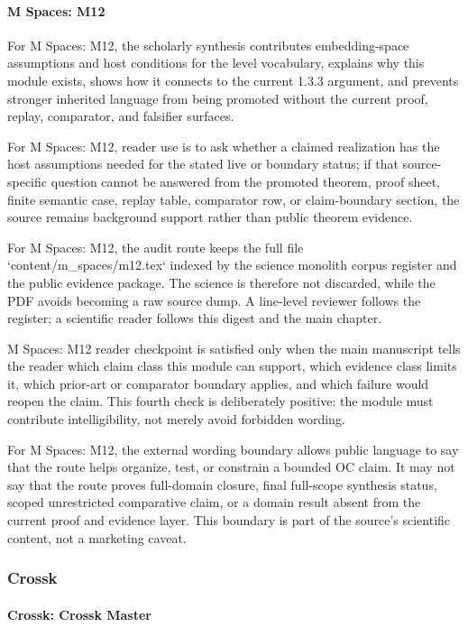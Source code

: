 \paragraph{M Spaces: M12}

For M Spaces: M12, the scholarly synthesis contributes embedding-space assumptions and host conditions for the level vocabulary, explains why this module exists, shows how it connects to the current 1.3.3 argument, and prevents stronger inherited language from being promoted without the current proof, replay, comparator, and falsifier surfaces.


For M Spaces: M12, reader use is to ask whether a claimed realization has the host assumptions needed for the stated live or boundary status; if that source-specific question cannot be answered from the promoted theorem, proof sheet, finite semantic case, replay table, comparator row, or claim-boundary section, the source remains background support rather than public theorem evidence.


For M Spaces: M12, the audit route keeps the full file `content/m\_spaces/m12.tex` indexed by the science monolith corpus register and the public evidence package. The science is therefore not discarded, while the PDF avoids becoming a raw source dump. A line-level reviewer follows the register; a scientific reader follows this digest and the main chapter.


M Spaces: M12 reader checkpoint is satisfied only when the main manuscript tells the reader which claim class this module can support, which evidence class limits it, which prior-art or comparator boundary applies, and which failure would reopen the claim. This fourth check is deliberately positive: the module must contribute intelligibility, not merely avoid forbidden wording.


For M Spaces: M12, the external wording boundary allows public language to say that the route helps organize, test, or constrain a bounded OC claim. It may not say that the route proves full-domain closure, final full-scope synthesis status, scoped unrestricted comparative claim, or a domain result absent from the current proof and evidence layer. This boundary is part of the source's scientific content, not a marketing caveat.


\subsubsection{Crossk}

\paragraph{Crossk: Crossk Master}

